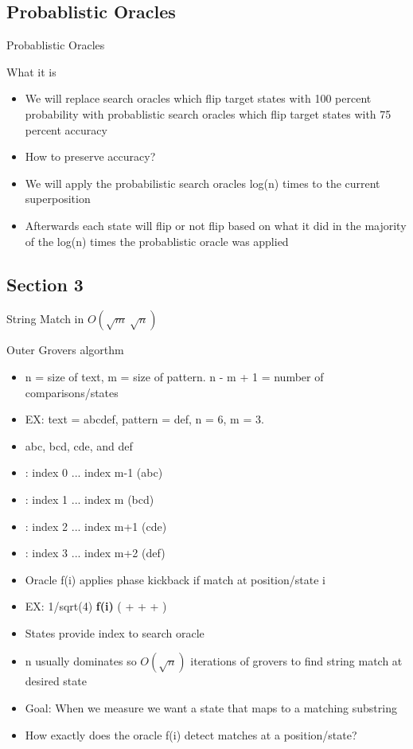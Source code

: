\documentclass{beamer}
\begin{document}
\subsection{Probablistic Oracles}
\begin{frame}{Probablistic Oracles}
    \begin{block}{What it is}
        \begin{itemize}
            \item We will replace search oracles which flip target states with 100 percent probability with probablistic search oracles which flip target states with 75 percent accuracy
            \item How to preserve accuracy? 
            \item We will apply the probabilistic search oracles log(n) times to the current superposition 
            \item Afterwards each state will flip or not flip based on what it did in the majority of the log(n) times the probablistic oracle was applied
        \end{itemize}
    \end{block}
\end{frame}

\subsection{Section 3}
\begin{frame}{String Match in \(O(\sqrt{m}\ \sqrt{n} )\)}
    \begin{block}{Outer Grovers algorthm}
        \begin{itemize}
            \item n = size of text, m = size of pattern. n - m + 1 = number of comparisons/states
            \item EX: text = abcdef, pattern = def, n = 6, m = 3.
            \item abc, bcd, cde, and def
            \item {}: index 0 ... index m-1 (abc)
            \item {}: index 1 ... index m   (bcd)
            \item {}: index 2 ... index m+1 (cde)
            \item {}: index 3 ... index m+2 (def)
            \item Oracle f(i) applies phase kickback if match at position/state i
            \item EX: 1/sqrt(4) \textbf{f(i)} ( +  +  + )
            \item States provide index to search oracle
            \item n usually dominates so \(O(\sqrt{n})\) iterations of grovers to find string match at desired state
            \item Goal: When we measure we want a state that maps to a matching substring
            \item How exactly does the oracle f(i) detect matches at a position/state?
        \end{itemize}
    \end{block}
\end{frame}
\end{document}
